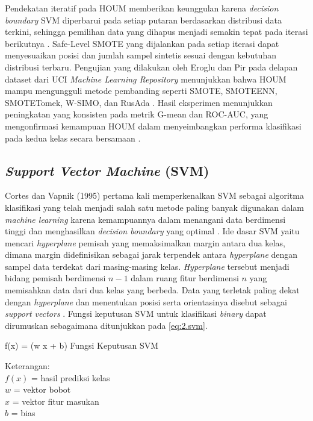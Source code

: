 Pendekatan iteratif pada HOUM memberikan keunggulan karena \textit{decision boundary} SVM diperbarui pada setiap putaran berdasarkan distribusi data terkini, sehingga pemilihan data yang dihapus menjadi semakin tepat pada iterasi berikutnya \cite{Eroglu2024HOUM}. Safe-Level SMOTE yang dijalankan pada setiap iterasi dapat menyesuaikan posisi dan jumlah sampel sintetis sesuai dengan kebutuhan distribusi terbaru. Pengujian yang dilakukan oleh Eroglu dan Pir pada delapan dataset dari UCI \textit{Machine Learning Repository} menunjukkan bahwa HOUM mampu mengungguli metode pembanding seperti SMOTE, SMOTEENN, SMOTETomek, W-SIMO, dan RusAda \cite{Eroglu2024HOUM}. Hasil eksperimen menunjukkan peningkatan yang konsisten pada metrik G-mean dan ROC-AUC, yang mengonfirmasi kemampuan HOUM dalam menyeimbangkan performa klasifikasi pada kedua kelas secara bersamaan \cite{Eroglu2024HOUM}.


\subsection{\textit{Support Vector Machine} (SVM)} \label{II.svm}
Cortes dan Vapnik (1995) pertama kali memperkenalkan SVM sebagai algoritma klasifikasi yang telah menjadi salah satu metode paling banyak digunakan dalam \textit{machine learning} karena kemampuannya dalam menangani data berdimensi tinggi dan menghasilkan \textit{decision boundary} yang optimal \cite{Cervantes2020SVM}. Ide dasar SVM yaitu mencari \textit{hyperplane} pemisah yang memaksimalkan margin antara dua kelas, dimana margin didefinisikan sebagai jarak terpendek antara \textit{hyperplane} dengan sampel data terdekat dari masing-masing kelas. \textit{Hyperplane} tersebut menjadi bidang pemisah berdimensi $n-1$ dalam ruang fitur berdimensi $n$ yang memisahkan data dari dua kelas yang berbeda. Data yang terletak paling dekat dengan \textit{hyperplane} dan menentukan posisi serta orientasinya disebut sebagai \textit{support vectors} \cite{Cervantes2020SVM, Abdullah2021SVM}. Fungsi keputusan SVM untuk klasifikasi \textit{binary} dapat dirumuskan sebagaimana ditunjukkan pada \ref{eq:2.svm}.

\begin{equationcaptioned}[eq:2.svm]{
    f(x) = (w \cdot x + b)
}{
    Fungsi Keputusan SVM
}
\end{equationcaptioned}

Keterangan: \\
$f(x)$ = hasil prediksi kelas \\
$w$ = vektor bobot \\
$x$ = vektor fitur masukan \\
$b$ = bias

